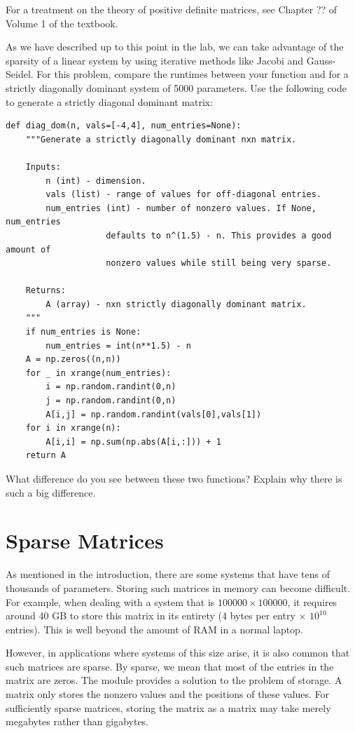 For a treatment on the theory of positive definite matrices, see Chapter ?? of
Volume 1 of the textbook.

\begin{problem}
As we have described up to this point in the lab, we can take advantage of the
sparsity of a linear system by using iterative methods like Jacobi and Gauss-Seidel.
For this problem, compare the runtimes between your  function and
 for a strictly diagonally dominant system of 5000 parameters. Use the following
code to generate a strictly diagonal dominant matrix:
\begin{lstlisting}
def diag_dom(n, vals=[-4,4], num_entries=None):
    """Generate a strictly diagonally dominant nxn matrix.

    Inputs:
        n (int) - dimension.
        vals (list) - range of values for off-diagonal entries.
        num_entries (int) - number of nonzero values. If None, num_entries
                    defaults to n^(1.5) - n. This provides a good amount of
                    nonzero values while still being very sparse.

    Returns:
        A (array) - nxn strictly diagonally dominant matrix.
    """
    if num_entries is None:
        num_entries = int(n**1.5) - n
    A = np.zeros((n,n))
    for _ in xrange(num_entries):
        i = np.random.randint(0,n)
        j = np.random.randint(0,n)
        A[i,j] = np.random.randint(vals[0],vals[1])
    for i in xrange(n):
        A[i,i] = np.sum(np.abs(A[i,:])) + 1
    return A
\end{lstlisting}
What difference do you see between these two functions? Explain why there is such a big difference.
\end{problem}

\section*{Sparse Matrices}
As mentioned in the introduction, there are some systems that have tens of
thousands of parameters. Storing such matrices in memory can become difficult.
For example, when dealing with a system that is $100000 \times 100000$, it
requires around 40 GB to store this matrix in its entirety (4 bytes per entry
$\times$ $10^{10}$ entries). This is well beyond the amount of RAM in a normal
laptop.

However, in applications where systems of this size arise, it is also common
that such matrices are sparse. By sparse, we mean that most of the entries in
the matrix are zeros. The  module provides a solution to the
problem of storage. A  matrix only stores the nonzero values and the positions
of these values. For sufficiently sparse matrices, storing the matrix as a
 matrix may take merely megabytes rather than gigabytes.

